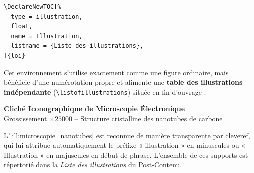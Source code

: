 \begin{verbatim}
\DeclareNewTOC[%
  type = illustration,
  float,
  name = Illustration,
  listname = {Liste des illustrations},
]{loi}
\end{verbatim}

Cet environnement s'utilise exactement comme une figure ordinaire, mais bénéficie d'une numérotation propre et alimente une \textbf{table des illustrations indépendante} (\texttt{\textbackslash listofillustrations}) située en fin d'ouvrage :

\begin{illustration}[htbp]
  \centering
  \begin{cadreFigure}[width=0.82\textwidth]
    \vspace{0.6cm}
    {\Large\sffamily\bfseries\color{primaryColor} Cliché Iconographique de Microscopie Électronique}\\[3mm]
    {\normalsize Grossissement $\times \num{25000}$ -- Structure cristalline des nanotubes de carbone}
    \vspace{0.6cm}
  \end{cadreFigure}
  \caption{Observation nanoscopique d'échantillons en champ sombre}
  \label{ill:microscopie_nanotubes}
\end{illustration}

L'\cref{ill:microscopie_nanotubes} est reconnue de manière transparente par \textsf{cleveref}, qui lui attribue automatiquement le préfixe « illustration » en minuscules ou « Illustration » en majuscules en début de phrase.
L'ensemble de ces supports est répertorié dans la \emph{Liste des illustrations} du Post-Contenu.

